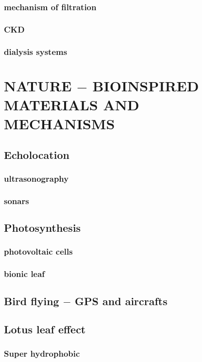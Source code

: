 \documentclass{article}
\begin{document}
	\subsubsection{mechanism of filtration}
	\subsubsection{CKD}
	\subsubsection{dialysis systems}
	\newpage

	\section{NATURE $-$ BIOINSPIRED MATERIALS AND MECHANISMS}
	\subsection{Echolocation}
	\subsubsection{ultrasonography}
	\subsubsection{sonars}

	\subsection{Photosynthesis}
	\subsubsection{photovoltaic cells}
	\subsubsection{bionic leaf}

	\subsection{Bird flying $-$ GPS and aircrafts}

	\subsection{Lotus leaf effect}
	\subsubsection{Super hydrophobic}
\end{document}
